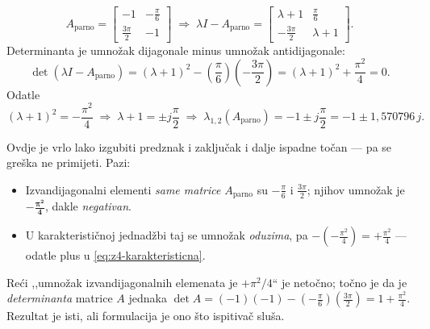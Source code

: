 \begin{korak}
\begin{equation}
A_{\mathrm{parno}} = \begin{bmatrix} -1 & -\tfrac{\pi}{6} \\[2pt] \tfrac{3\pi}{2} & -1 \end{bmatrix}
\;\Longrightarrow\;
\lambda I - A_{\mathrm{parno}} = \begin{bmatrix} \lambda + 1 & \tfrac{\pi}{6} \\[2pt] -\tfrac{3\pi}{2} & \lambda + 1 \end{bmatrix}.
\end{equation}
Determinanta je umnožak dijagonale minus umnožak antidijagonale:
\begin{equation}
\det(\lambda I - A_{\mathrm{parno}})
= (\lambda+1)^2 - \left(\frac{\pi}{6}\right)\left(-\frac{3\pi}{2}\right)
= (\lambda+1)^2 + \frac{\pi^2}{4} = 0 .
\label{eq:z4-karakteristicna}
\end{equation}
Odatle
\begin{equation}
(\lambda + 1)^2 = -\frac{\pi^2}{4}
\;\Longrightarrow\;
\lambda + 1 = \pm j\frac{\pi}{2}
\;\Longrightarrow\;
\lambda_{1,2}(A_{\mathrm{parno}}) = -1 \pm j\frac{\pi}{2} = -1 \pm 1{,}570796\,j .
\end{equation}
\end{korak}

\begin{zamka}
Ovdje je vrlo lako izgubiti predznak i zaključak i dalje ispadne točan --- pa se
greška ne primijeti. Pazi:
\begin{itemize}[nosep,leftmargin=*]
  \item Izvandijagonalni elementi \emph{same matrice} $A_{\mathrm{parno}}$ su
        $-\tfrac{\pi}{6}$ i $\tfrac{3\pi}{2}$; njihov umnožak je
        $\boldsymbol{-\tfrac{\pi^2}{4}}$, dakle \emph{negativan}.
  \item U karakterističnoj jednadžbi taj se umnožak \emph{oduzima}, pa
        $-(-\tfrac{\pi^2}{4}) = +\tfrac{\pi^2}{4}$ --- odatle plus u
        \eqref{eq:z4-karakteristicna}.
\end{itemize}
Reći ,,umnožak izvandijagonalnih elemenata je $+\pi^2/4$`` je netočno; točno je
da je \emph{determinanta} matrice $A$ jednaka
$\det A = (-1)(-1) - (-\tfrac{\pi}{6})(\tfrac{3\pi}{2}) = 1 + \tfrac{\pi^2}{4}$.
Rezultat je isti, ali formulacija je ono što ispitivač sluša.
\end{zamka}

